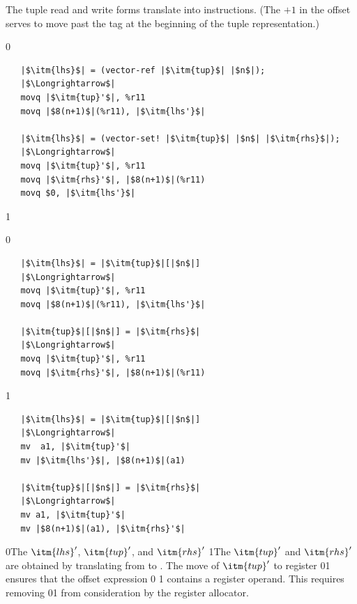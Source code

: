 \documentclass[7x10]{TimesAPriori_MIT}%
\def\racketEd{0}
\def\pythonEd{1}
\def\edition{1}
\def\xeightysixEd{0}
\def\riscvEd{1}
\def\architecture{1}
\newcommand\ifriscv[1]{\if\architecture\riscvEd{#1}\fi}
\newcommand\ifxeightsix[1]{\if\architecture\xeightysixEd{#1}\fi}
\newcommand{\racket}[1]{{\if\edition\racketEd{#1}\fi}}
\newcommand{\pythonColor}[0]{}
\newcommand{\python}[1]{{\if\edition\pythonEd\pythonColor #1\fi}}
\numberwithin{theorem}{chapter}
\numberwithin{definition}{chapter}
\numberwithin{equation}{chapter}
\begin{document}
The tuple read and write forms translate into \IMOVE{}
instructions.  (The $+1$ in the offset serves to move past the tag at the
beginning of the tuple representation.)
%
\begin{center}
\begin{minipage}{\textwidth}
{\if\edition\racketEd    
\begin{lstlisting}
   |$\itm{lhs}$| = (vector-ref |$\itm{tup}$| |$n$|);
   |$\Longrightarrow$|
   movq |$\itm{tup}'$|, %r11
   movq |$8(n+1)$|(%r11), |$\itm{lhs'}$|

   |$\itm{lhs}$| = (vector-set! |$\itm{tup}$| |$n$| |$\itm{rhs}$|);
   |$\Longrightarrow$|
   movq |$\itm{tup}'$|, %r11
   movq |$\itm{rhs}'$|, |$8(n+1)$|(%r11)
   movq $0, |$\itm{lhs'}$|
\end{lstlisting}
\fi}
{\if\edition\pythonEd\pythonColor
{\if\architecture\xeightysixEd
\begin{lstlisting}
   |$\itm{lhs}$| = |$\itm{tup}$|[|$n$|]
   |$\Longrightarrow$|
   movq |$\itm{tup}'$|, %r11
   movq |$8(n+1)$|(%r11), |$\itm{lhs'}$|

   |$\itm{tup}$|[|$n$|] = |$\itm{rhs}$|
   |$\Longrightarrow$|
   movq |$\itm{tup}'$|, %r11
   movq |$\itm{rhs}'$|, |$8(n+1)$|(%r11)
\end{lstlisting}
  \fi}
{\if\architecture\riscvEd
\begin{lstlisting}
   |$\itm{lhs}$| = |$\itm{tup}$|[|$n$|]
   |$\Longrightarrow$|
   mv  a1, |$\itm{tup}'$|
   mv |$\itm{lhs'}$|, |$8(n+1)$|(a1)

   |$\itm{tup}$|[|$n$|] = |$\itm{rhs}$|
   |$\Longrightarrow$|
   mv a1, |$\itm{tup}'$|
   mv |$8(n+1)$|(a1), |$\itm{rhs}'$|
\end{lstlisting}
  \fi}
\fi}
\end{minipage}
\end{center}
\racket{The $\itm{lhs}'$, $\itm{tup}'$, and $\itm{rhs}'$}
\python{The $\itm{tup}'$ and $\itm{rhs}'$}
are obtained by translating from \LangCVec{} to \ArchName.
%
The move of $\itm{tup}'$ to
register \ifxeightsix{}\ifriscv{} ensures that the offset expression
\ifxeightsix{}
\ifriscv{}
contains a register operand.  This requires
removing \ifxeightsix{}\ifriscv{} from consideration by the register allocator.
\end{document}
